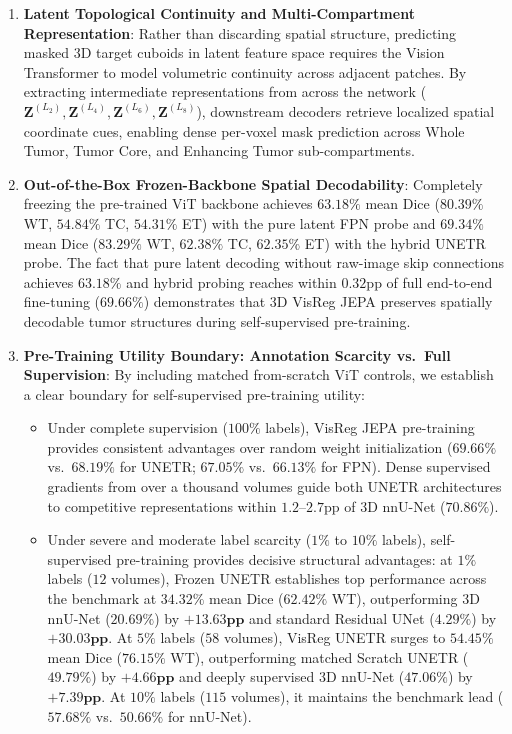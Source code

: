 \documentclass{article}
\begin{document}
\begin{enumerate}
    \item \textbf{Latent Topological Continuity and Multi-Compartment Representation}: Rather than discarding spatial structure, predicting masked 3D target cuboids in latent feature space requires the Vision Transformer to model volumetric continuity across adjacent patches. By extracting intermediate representations from across the network ($\mathbf{Z}^{(L_2)}, \mathbf{Z}^{(L_4)}, \mathbf{Z}^{(L_6)}, \mathbf{Z}^{(L_8)}$), downstream decoders retrieve localized spatial coordinate cues, enabling dense per-voxel mask prediction across Whole Tumor, Tumor Core, and Enhancing Tumor sub-compartments.
    \item \textbf{Out-of-the-Box Frozen-Backbone Spatial Decodability}: Completely freezing the pre-trained ViT backbone achieves $63.18\%$ mean Dice ($80.39\%$ WT, $54.84\%$ TC, $54.31\%$ ET) with the pure latent FPN probe and $69.34\%$ mean Dice ($83.29\%$ WT, $62.38\%$ TC, $62.35\%$ ET) with the hybrid UNETR probe. The fact that pure latent decoding without raw-image skip connections achieves $63.18\%$ and hybrid probing reaches within $0.32\text{pp}$ of full end-to-end fine-tuning ($69.66\%$) demonstrates that 3D VisReg JEPA preserves spatially decodable tumor structures during self-supervised pre-training.
    \item \textbf{Pre-Training Utility Boundary: Annotation Scarcity vs.\ Full Supervision}: By including matched from-scratch ViT controls, we establish a clear boundary for self-supervised pre-training utility:
    \begin{itemize}
        \item Under complete supervision ($100\%$ labels), VisReg JEPA pre-training provides consistent advantages over random weight initialization ($69.66\%$ vs.\ $68.19\%$ for UNETR; $67.05\%$ vs.\ $66.13\%$ for FPN). Dense supervised gradients from over a thousand volumes guide both UNETR architectures to competitive representations within $1.2\text{--}2.7\text{pp}$ of 3D nnU-Net ($70.86\%$).
        \item Under severe and moderate label scarcity ($1\%$ to $10\%$ labels), self-supervised pre-training provides decisive structural advantages: at $1\%$ labels ($12$ volumes), Frozen UNETR establishes top performance across the benchmark at $\mathbf{34.32\%}$ mean Dice ($62.42\%$ WT), outperforming 3D nnU-Net ($20.69\%$) by $\mathbf{+13.63\text{pp}}$ and standard Residual UNet ($4.29\%$) by $\mathbf{+30.03\text{pp}}$. At $5\%$ labels ($58$ volumes), VisReg UNETR surges to $\mathbf{54.45\%}$ mean Dice ($76.15\%$ WT), outperforming matched Scratch UNETR ($49.79\%$) by $\mathbf{+4.66\text{pp}}$ and deeply supervised 3D nnU-Net ($47.06\%$) by $\mathbf{+7.39\text{pp}}$. At $10\%$ labels ($115$ volumes), it maintains the benchmark lead ($\mathbf{57.68\%}$ vs.\ $50.66\%$ for nnU-Net).

\end{itemize}
\end{enumerate}
\end{document}
